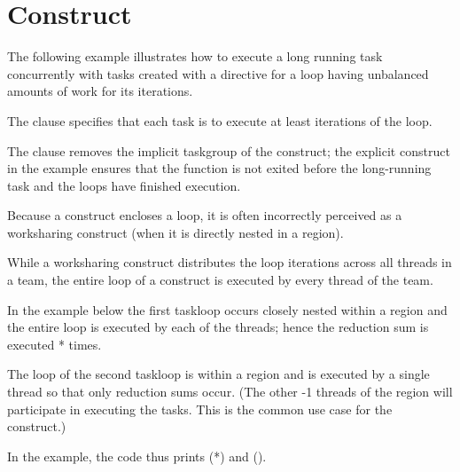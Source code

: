 \section{ Construct}
\label{sec:taskloop}

The following example illustrates how to execute a long running task concurrently with tasks created
with a  directive for a loop having unbalanced amounts of work for its iterations.

The  clause specifies that each task is to execute at least  iterations of the loop. 

The  clause removes the implicit taskgroup of the  construct; 
the explicit  construct in the example ensures that the function is not exited 
before the long-running task and the loops have finished execution.




Because a  construct encloses a loop, it is often incorrectly 
perceived as a worksharing construct (when it is directly nested in 
a  region).

While a worksharing construct distributes the loop iterations across all threads in a team,
the entire loop of a  construct is executed by every thread of the team.

In the example below the first taskloop occurs closely nested within 
a  region and the entire loop is executed by each of the  threads; 
hence the reduction sum is executed * times.
 
The loop of the second taskloop is within a  region and is executed
by a single thread so that only  reduction sums occur.  (The other
-1 threads of the  region will participate in executing the 
tasks. This is the common use case for the  construct.)

In the example, the code thus prints  (*) and 
 ().


